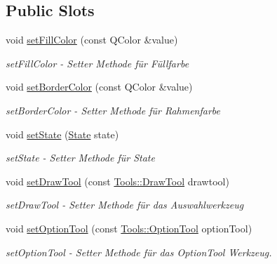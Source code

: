 \subsection*{Public Slots}
\begin{DoxyCompactItemize}
\item 
void \hyperlink{class_tools_a4912994771a4424b9aec1a7b16d31176}{set\+Fill\+Color} (const Q\+Color \&value)
\begin{DoxyCompactList}\small\item\em set\+Fill\+Color -\/ Setter Methode für Füllfarbe \end{DoxyCompactList}\item 
void \hyperlink{class_tools_a94304e05407643ce69f20ba93538d3d5}{set\+Border\+Color} (const Q\+Color \&value)
\begin{DoxyCompactList}\small\item\em set\+Border\+Color -\/ Setter Methode für Rahmenfarbe \end{DoxyCompactList}\item 
void \hyperlink{class_tools_abdf68db9740ba504701fe00d97a031e2}{set\+State} (\hyperlink{class_tools_a2847c269682818722541d9002fdf0824}{State} state)
\begin{DoxyCompactList}\small\item\em set\+State -\/ Setter Methode für State \end{DoxyCompactList}\item 
void \hyperlink{class_tools_aa53c7186fb6cd6104ff42014b6f44f93}{set\+Draw\+Tool} (const \hyperlink{class_tools_ab031688a77e89a80ce8b5db7014684a3}{Tools\+::\+Draw\+Tool} drawtool)
\begin{DoxyCompactList}\small\item\em set\+Draw\+Tool -\/ Setter Methode für das Auswahlwerkzeug \end{DoxyCompactList}\item 
void \hyperlink{class_tools_af69d4aa896ef3e1b06ce65e5df53f060}{set\+Option\+Tool} (const \hyperlink{class_tools_a4b55b2ca4eef4d80ae1042233832bb8b}{Tools\+::\+Option\+Tool} option\+Tool)
\begin{DoxyCompactList}\small\item\em set\+Option\+Tool -\/ Setter Methode für das Option\+Tool Werkzeug. \end{DoxyCompactList}\end{DoxyCompactItemize}
